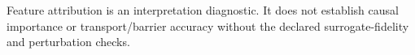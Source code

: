 Feature attribution is an interpretation diagnostic. It does not establish causal importance or transport/barrier accuracy without the declared surrogate-fidelity and perturbation checks.

